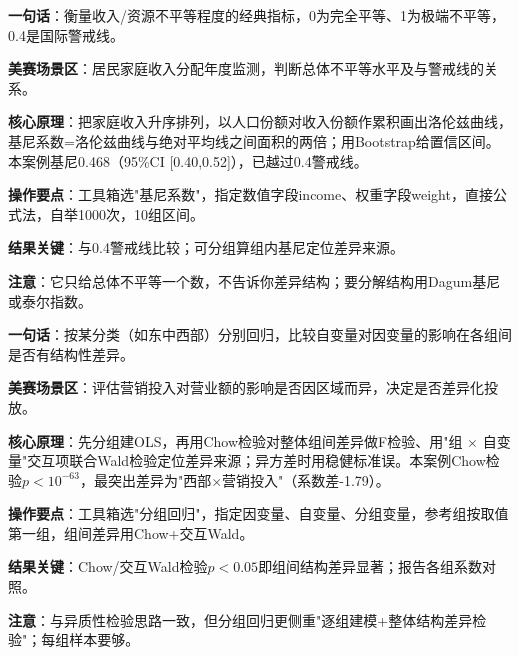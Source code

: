 
\begin{algobrief}
\textbf{一句话}：衡量收入/资源不平等程度的经典指标，0为完全平等、1为极端不平等，0.4是国际警戒线。

\textbf{美赛场景区}：居民家庭收入分配年度监测，判断总体不平等水平及与警戒线的关系。

\textbf{核心原理}：把家庭收入升序排列，以人口份额对收入份额作累积画出洛伦兹曲线，基尼系数=洛伦兹曲线与绝对平均线之间面积的两倍；用Bootstrap给置信区间。本案例基尼0.468（95\%CI [0.40,0.52]），已越过0.4警戒线。

\textbf{操作要点}：工具箱选"基尼系数"，指定数值字段income、权重字段weight，直接公式法，自举1000次，10组区间。

\textbf{结果关键}：与0.4警戒线比较；可分组算组内基尼定位差异来源。

\textbf{注意}：它只给总体不平等一个数，不告诉你差异结构；要分解结构用Dagum基尼或泰尔指数。
\end{algobrief}


\begin{algobrief}
\textbf{一句话}：按某分类（如东中西部）分别回归，比较自变量对因变量的影响在各组间是否有结构性差异。

\textbf{美赛场景区}：评估营销投入对营业额的影响是否因区域而异，决定是否差异化投放。

\textbf{核心原理}：先分组建OLS，再用Chow检验对整体组间差异做F检验、用"组 $\times$ 自变量"交互项联合Wald检验定位差异来源；异方差时用稳健标准误。本案例Chow检验$p<10^{-63}$，最突出差异为"西部$\times$营销投入"（系数差-1.79）。

\textbf{操作要点}：工具箱选"分组回归"，指定因变量、自变量、分组变量，参考组按取值第一组，组间差异用Chow+交互Wald。

\textbf{结果关键}：Chow/交互Wald检验$p<0.05$即组间结构差异显著；报告各组系数对照。

\textbf{注意}：与异质性检验思路一致，但分组回归更侧重"逐组建模+整体结构差异检验"；每组样本要够。
\end{algobrief}



